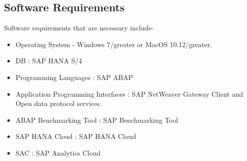 \subsection{Software Requirements}
Software requirements that are necessary include-
\begin{itemize}
    \item Operating System - Windows 7/greater or MacOS 10.12/greater.
    \item DB : SAP HANA S/4
    \item Programming Languages : SAP ABAP
    \item Application Programming Interfaces : SAP NetWeaver Gateway Client and Open data protocol services.
    \item ABAP Benchmarking Tool : SAP Benchmarking Tool
    \item SAP HANA Cloud : SAP HANA Cloud
    \item SAC : SAP Analytics Cloud
    
\end{itemize}









